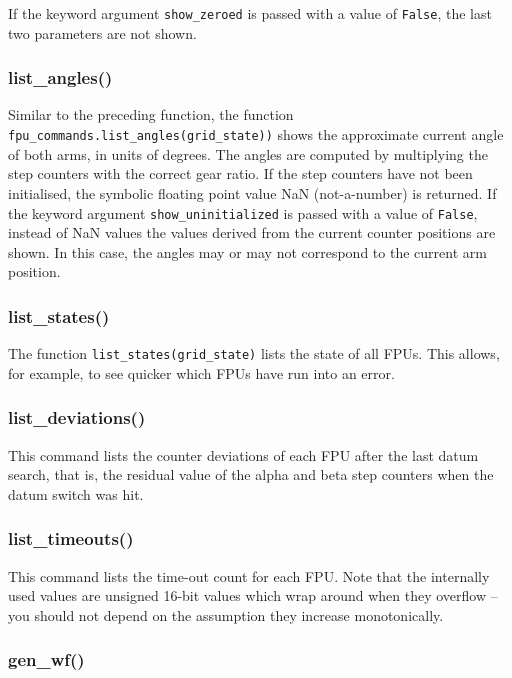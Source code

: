 \documentclass[11pt,a4paper]{scrartcl}
\begin{document}
If the keyword argument \texttt{show\_zeroed} is passed with a value of
\texttt{False}, the last two parameters are not shown.

\subsubsection{list\_angles()}
\label{sec:listangles}

Similar to the preceding function, the function
\texttt{fpu\_commands.list\_angles(grid\_state))} shows the
approximate current angle of both arms, in units of degrees. The
angles are computed by multiplying the step counters with the correct
gear ratio. If the step counters have not been initialised, the
symbolic floating point value NaN (not-a-number) is returned.  If the
keyword argument \texttt{show\_uninitialized} is passed with a value
of \texttt{False}, instead of NaN values the values derived from the
current counter positions are shown. In this case, the angles may or
may not correspond to the current arm position.

\subsubsection{list\_states()}
\label{sec:liststates}

The function \texttt{list\_states(grid\_state)} lists the state of all
FPUs. This allows, for example, to see quicker which FPUs have run into an error.

\subsubsection{list\_deviations()}
This command lists the counter deviations of each FPU after the last
datum search, that is, the residual value of the alpha and beta step
counters when the datum switch was hit.

\subsubsection{list\_timeouts()}
 This command lists the time-out count for
each FPU. Note that the internally used values are unsigned 16-bit
values which wrap around when they overflow -- you should not depend
on the assumption they increase monotonically.


\subsubsection{gen\_wf()}
\label{sec:genwf}
\end{document}
